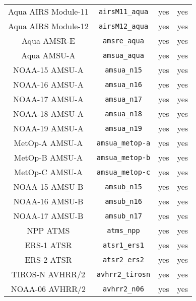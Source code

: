 \begin{center}
\begin{longtable}{c c c c}
  Aqua AIRS Module-11                & \texttt{airsM11\_aqua}       &  yes     &  yes       \\
  Aqua AIRS Module-12                & \texttt{airsM12\_aqua}       &  yes     &  yes       \\
  Aqua AMSR-E                        & \texttt{amsre\_aqua}         &  yes     &  yes       \\
  Aqua AMSU-A                        & \texttt{amsua\_aqua}         &  yes     &  yes       \\
  NOAA-15 AMSU-A                     & \texttt{amsua\_n15}          &  yes     &  yes       \\
  NOAA-16 AMSU-A                     & \texttt{amsua\_n16}          &  yes     &  yes       \\
  NOAA-17 AMSU-A                     & \texttt{amsua\_n17}          &  yes     &  yes       \\
  NOAA-18 AMSU-A                     & \texttt{amsua\_n18}          &  yes     &  yes       \\
  NOAA-19 AMSU-A                     & \texttt{amsua\_n19}          &  yes     &  yes       \\
  MetOp-A AMSU-A                     & \texttt{amsua\_metop-a}      &  yes     &  yes       \\
  MetOp-B AMSU-A                     & \texttt{amsua\_metop-b}      &  yes     &  yes       \\
  MetOp-C AMSU-A                     & \texttt{amsua\_metop-c}      &  yes     &  yes       \\
  NOAA-15 AMSU-B                     & \texttt{amsub\_n15}          &  yes     &  yes       \\
  NOAA-16 AMSU-B                     & \texttt{amsub\_n16}          &  yes     &  yes       \\
  NOAA-17 AMSU-B                     & \texttt{amsub\_n17}          &  yes     &  yes       \\
  NPP ATMS                           & \texttt{atms\_npp}           &  yes     &  yes       \\
  ERS-1 ATSR                         & \texttt{atsr1\_ers1}         &  yes     &  yes       \\
  ERS-2 ATSR                         & \texttt{atsr2\_ers2}         &  yes     &  yes       \\
  TIROS-N AVHRR/2                    & \texttt{avhrr2\_tirosn}      &  yes     &  yes       \\
  NOAA-06 AVHRR/2                    & \texttt{avhrr2\_n06}         &  yes     &  yes       \\

\end{longtable}
\end{center}
